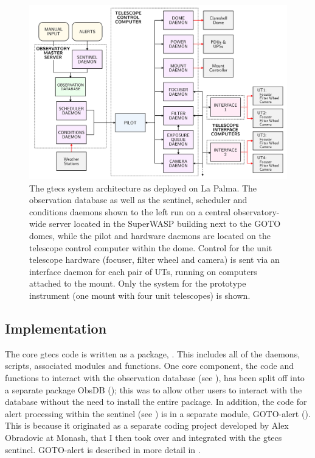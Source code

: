 \begin{colsection}
\begin{colsection}
\begin{figure}[p]
    \begin{center}
        \includegraphics[width=\linewidth]{images/flow.pdf}
    \end{center}
    \caption[The G-TeCS system architecture]{
        The \gls{gtecs} system architecture as deployed on La Palma. The observation database as well as the sentinel, scheduler and conditions daemons shown to the left run on a central observatory-wide server located in the SuperWASP building next to the GOTO domes, while the pilot and hardware daemons are located on the telescope control computer within the dome. Control for the unit telescope hardware (focuser, filter wheel and camera) is sent via an interface daemon for each pair of UTs, running on computers attached to the mount. Only the system for the prototype instrument (one mount with four unit telescopes) is shown.
    }\label{fig:flow}
\end{figure}

\end{colsection}


\subsection{Implementation}
\label{sec:implementation}
\begin{colsection}

The core \gls{gtecs} code is written as a  package, . This includes all of the daemons, scripts, associated modules and functions. One core component, the code and functions to interact with the observation database (see ), has been split off into a separate  package ObsDB (); this was to allow other users to interact with the database without the need to install the entire  package. In addition, the code for alert processing within the sentinel (see ) is in a separate module, GOTO-alert (). This is because it originated as a separate coding project developed by Alex Obradovic at Monash, that I then took over and integrated with the \gls{gtecs} sentinel. GOTO-alert is described in more detail in .


\end{colsection}
\end{colsection}
